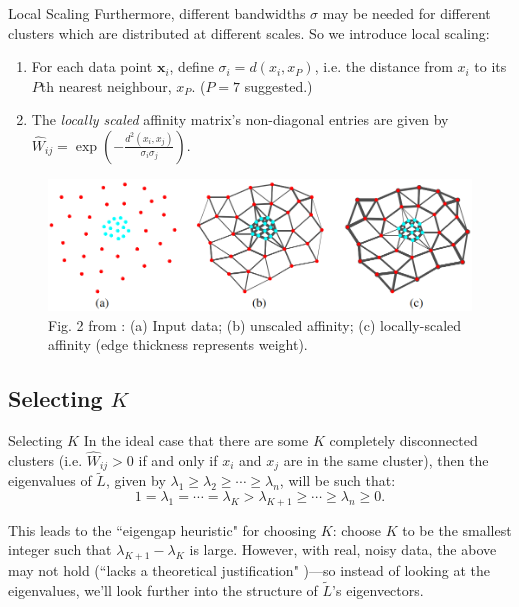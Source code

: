 \documentclass[aspectratio=169]{beamer}
\begin{document}
\begin{frame}{Local Scaling}
    Furthermore, different bandwidths $\sigma$ may be needed for different clusters which are distributed at different scales.
    So we introduce \alert{local scaling}:
    \pause
    \begin{enumerate}%
      \item For each data point $\mathbf{x}_i$, define $\sigma_i = d(x_i, x_P)$, i.e. the distance from $x_i$ to its $P$th nearest neighbour, $x_P$. ($P=7$ suggested.)
      \pause
      \item The \textit{locally scaled} affinity matrix's non-diagonal entries are given by $\hat{W}_{ij} = \exp\left(-\frac{d^2(x_i, x_j)}{\sigma_i \sigma_j}\right)$.
    \end{enumerate}
    \pause
    \begin{figure}
      \centering
      \includegraphics[scale=0.22]{local_scaling.png}
      \caption{Fig. 2 from \cite{zelnik-manor_self-tuning_2004}: (a) Input data; (b) unscaled affinity; (c) locally-scaled affinity (edge thickness represents weight).}
    \end{figure}
\end{frame}

\subsection{Selecting $K$}
\begin{frame}{Selecting $K$}
    In the ideal case that there are some $K$ completely disconnected clusters (i.e. $\hat{W}_{ij} > 0$ if and only if $x_i$ and $x_j$ are in the same cluster), then the eigenvalues of $\tilde{L}$, given by $\lambda_1 \geq \lambda_2 \geq \cdots \geq \lambda_n$, will be such that:
    \[1 = \lambda_1 = \cdots = \lambda_K > \lambda_{K+1} \geq \cdots \geq \lambda_n \geq 0.\]
    
    This leads to the ``eigengap heuristic" for choosing $K$: choose $K$ to be the smallest integer such that $\lambda_{K+1} - \lambda_K$ is large.
    \newline\newline
    \pause
    However, with real, noisy data, the above may not hold (``lacks a theoretical justification" \cite{zelnik-manor_self-tuning_2004})---so instead of looking at the eigenvalues, we'll look further into the structure of $\tilde{L}$'s eigenvectors.

\end{frame}
\end{document}
